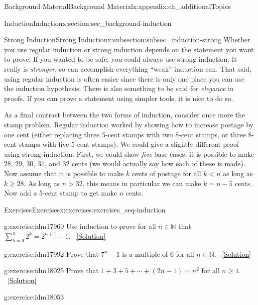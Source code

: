 \documentclass[oneside,10pt,]{book}
\numberwithin{equation}{chapter}
\def\d{\displaystyle}
\def\N{\mathbb N}
\newcommand{\lt}{<}
\begin{document}
\begin{appendixptx}{Background Material}{}{Background Material}{}{}{x:appendix:ch_additionalTopics}
\begin{sectionptx}{Induction}{}{Induction}{}{}{x:section:sec_background-induction}
\begin{subsectionptx}{Strong Induction}{}{Strong Induction}{}{}{x:subsection:subsec_induction-strong}
Whether you use regular induction or strong induction depends on the statement you want to prove. If you wanted to be safe, you could always use strong induction. It really is \emph{stronger}, so can accomplish everything ``weak'' induction can. That said, using regular induction is often easier since there is only one place you can use the induction hypothesis. There is also something to be said for \emph{elegance} in proofs. If you can prove a statement using simpler tools, it is nice to do so.%
\par
As a final contrast between the two forms of induction, consider once more the stamp problem. Regular induction worked by showing how to increase postage by one cent (either replacing three 5-cent stamps with two 8-cent stamps, or three 8-cent stamps with five 5-cent stamps). We could give a slightly different proof using strong induction. First, we could show \emph{five} base cases: it is possible to make 28, 29, 30, 31, and 32 cents (we would actually say how each of these is made). Now assume that it is possible to make \(k\) cents of postage for all \(k \lt  n\) as long as \(k \ge 28\). As long as \(n > 32\), this means in particular we can make \(k = n-5\) cents. Now add a 5-cent stamp to get make \(n\) cents.%
\end{subsectionptx}
%
%
\typeout{************************************************}
\typeout{************************************************}
%
\begin{exercises-subsection}{Exercises}{}{Exercises}{}{}{x:exercises:exercises_seq-induction}
\begin{divisionexercise}{1}{}{}{g:exercise:idm17960}%
Use induction to prove for all \(n \in \N\) that \(\d\sum_{k=0}^n 2^k = 2^{n+1} - 1\).%
\qquad~\hfill{\tiny\hyperlink{g:solution:idm17965-main}{[Solution]}}\end{divisionexercise}%
\begin{divisionexercise}{2}{}{}{g:exercise:idm17992}%
Prove that \(7^n - 1\) is a multiple of 6 for all \(n \in \N\).%
\qquad~\hfill{\tiny\hyperlink{g:solution:idm17997-main}{[Solution]}}\end{divisionexercise}%
\begin{divisionexercise}{3}{}{}{g:exercise:idm18025}%
Prove that \(1 + 3 + 5 + \cdots + (2n-1) = n^2\) for all \(n \ge 1\).%
\qquad~\hfill{\tiny\hyperlink{g:solution:idm18030-main}{[Solution]}}\end{divisionexercise}%
\begin{divisionexercise}{4}{}{}{g:exercise:idm18053}%

\end{divisionexercise}
\end{exercises-subsection}
\end{sectionptx}
\end{appendixptx}
\end{document}
